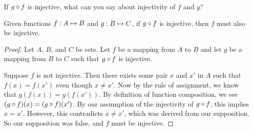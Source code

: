 \documentclass[main.tex]{subfiles}
\begin{document}
\subproblem{}\label{s2p4c}

If \({g} \circ{} {f}\) is injective, what can you say about injectivity of \(f\)
and \(g\)?

\begin{thm}
	Given functions \({f}: {A} \mapsto{} {B}\) and \({g}: {B} \mapsto{} {C}\), if
	\({g} \circ{} {f}\) is injective, then \(f\) must also be injective.
\end{thm}
\begin{proof}
	Let \(A\), \(B\), and \(C\) be sets. Let \(f\) be a mapping from \(A\)
	to \(B\) and let \(g\) be a mapping from \(B\) to \(C\) such that
	\({g} \circ{} {f}\) is injective.

	Suppose \(f\) is not injective. Then there exists some pair \(x\) and
	\(x'\) in \(A\) such that \(f(x) = f(x')\) even though \(x \neq x'\).
	Now by the rule of assignment, we know that \(g(f(x)) = g(f(x'))\). By
	definition of function composition, we see
	\(({g} \circ{} {f})(x) = ({g} \circ{} {f})(x')\). By our assumption of the
	injectivity of \({g} \circ{} {f}\), this implies \(x = x'\). However,
	this contradicts \(x \neq x'\), which was derived from our supposition.
	So our supposition was false, and \(f\) must be injective.
\end{proof}
\end{document}
